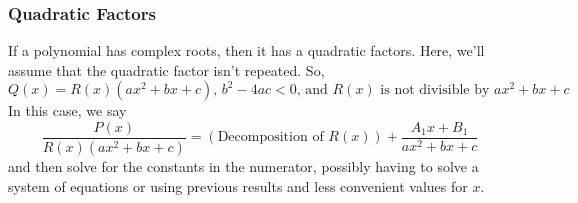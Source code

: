 \subsubsection{Quadratic Factors}

If a polynomial has complex roots, then it has a quadratic factors.
Here, we'll assume that the quadratic factor isn't repeated. 
So,
\begin{equation*}
	Q(x) = R(x)(ax^2+bx+c)\text{, }b^2-4ac < 0\text{, and }R(x)\text{ is not divisible by }ax^2+bx+c
\end{equation*}
In this case, we say
\begin{equation*}
	\frac{P(x)}{R(x)(ax^2+bx+c)} = \left(\text{Decomposition of }R(x)\right)+\frac{A_1x+B_1}{ax^2+bx+c}
\end{equation*}
and then solve for the constants in the numerator, possibly having to solve a system of equations or using previous results and less convenient values for $x$.

